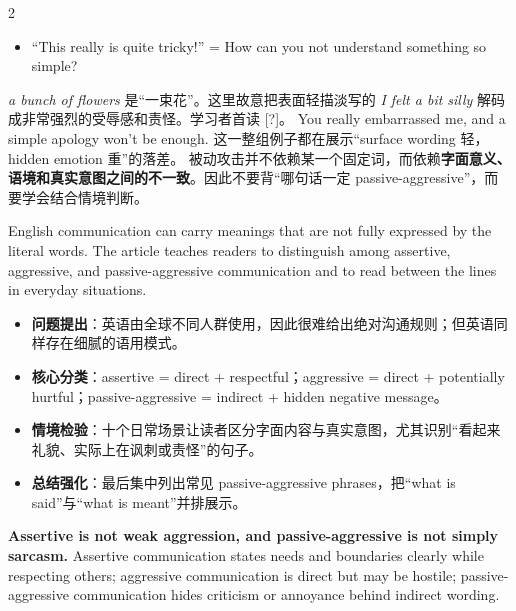 \documentclass[11pt,a4paper]{ctexart}
\begin{document}
\begin{paracol}{2}
{\begin{itemize}[leftmargin=*]
    \item ``This really is quite tricky!'' = How can you not understand something so simple?
  \end{itemize}
}
\switchcolumn
{}
  {\textit{a bunch of flowers} 是“一束花”。这里故意把表面轻描淡写的 \textit{I felt a bit silly} 解码成非常强烈的受辱感和责怪。学习者首读 [?]。}
  {You really embarrassed me, and a simple apology won't be enough.}
  {这一整组例子都在展示“surface wording 轻，hidden emotion 重”的落差。}
  {被动攻击并不依赖某一个固定词，而依赖\textbf{字面意义、语境和真实意图之间的不一致}。因此不要背“哪句话一定 passive-aggressive”，而要学会结合情境判断。}

\end{paracol}


\begin{coretakeaway}[训练后主旨]
  English communication can carry meanings that are not fully expressed by the literal words. The article teaches readers to distinguish among assertive, aggressive, and passive-aggressive communication and to read between the lines in everyday situations.
\end{coretakeaway}

\begin{itemize}
  \item \textbf{问题提出}：英语由全球不同人群使用，因此很难给出绝对沟通规则；但英语同样存在细腻的语用模式。
  \item \textbf{核心分类}：assertive = direct + respectful；aggressive = direct + potentially hurtful；passive-aggressive = indirect + hidden negative message。
  \item \textbf{情境检验}：十个日常场景让读者区分字面内容与真实意图，尤其识别“看起来礼貌、实际上在讽刺或责怪”的句子。
  \item \textbf{总结强化}：最后集中列出常见 passive-aggressive phrases，把“what is said”与“what is meant”并排展示。
\end{itemize}

\begin{coretakeaway}[本篇最重要的概念边界]
  \textbf{Assertive is not weak aggression, and passive-aggressive is not simply sarcasm.} Assertive communication states needs and boundaries clearly while respecting others; aggressive communication is direct but may be hostile; passive-aggressive communication hides criticism or annoyance behind indirect wording.
\end{coretakeaway}
\end{document}
